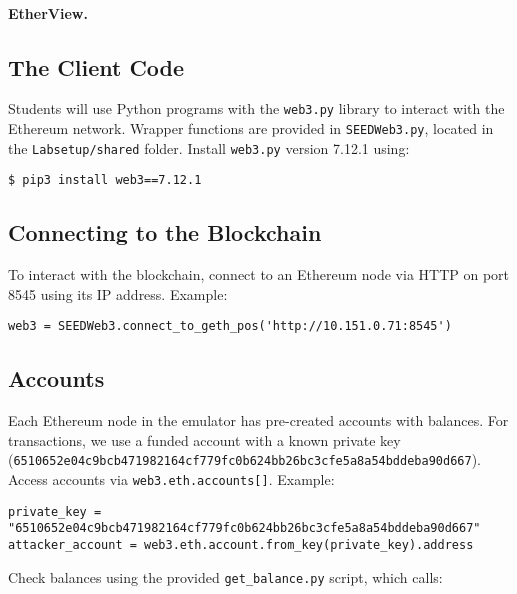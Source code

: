 

\paragraph{EtherView.}


\subsection{The Client Code}

Students will use Python programs with the \texttt{web3.py} library to interact with the Ethereum network. Wrapper functions are provided in \texttt{SEEDWeb3.py}, located in the \texttt{Labsetup/shared} folder. Install \texttt{web3.py} version 7.12.1 using:

\begin{lstlisting}
$ pip3 install web3==7.12.1
\end{lstlisting}

\subsection{Connecting to the Blockchain}
\label{sec:sub:ports}

To interact with the blockchain, connect to an Ethereum node via HTTP on port 8545 using its IP address. Example:

\begin{lstlisting}
web3 = SEEDWeb3.connect_to_geth_pos('http://10.151.0.71:8545')
\end{lstlisting}

\subsection{Accounts}

Each Ethereum node in the emulator has pre-created accounts with balances. For transactions, we use a funded account with a known private key (\texttt{\scriptsize 6510652e04c9bcb471982164cf779fc0b624bb26bc3cfe5a8a54bddeba90d667}). Access accounts via \texttt{web3.eth.accounts[]}. Example:

\begin{lstlisting}
private_key = "6510652e04c9bcb471982164cf779fc0b624bb26bc3cfe5a8a54bddeba90d667"
attacker_account = web3.eth.account.from_key(private_key).address
\end{lstlisting}

Check balances using the provided \texttt{get\_balance.py} script, which calls:

